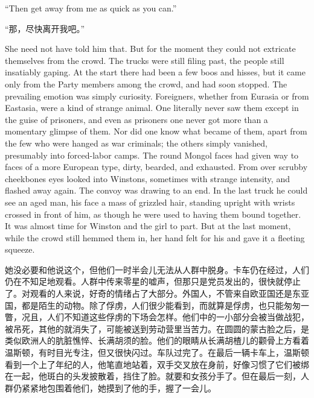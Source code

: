 \begin{paracol}{2}
``Then get away from me as quick as you can.''

\switchcolumn

``那，尽快离开我吧。''

\switchcolumn*

She need not have told him that. But for the moment they could not
extricate themselves from the crowd. The trucks were still filing past,
the people still insatiably gaping. At the start there had been a few
boos and hisses, but it came only from the Party members among the
crowd, and had soon stopped. The prevailing emotion was simply
curiosity. Foreigners, whether from Eurasia or from Eastasia, were a
kind of strange animal. One literally never saw them except in the guise
of prisoners, and even as prisoners one never got more than a momentary
glimpse of them. Nor did one know what became of them, apart from the
few who were hanged as war criminals; the others simply vanished,
presumably into forced-labor camps. The round Mongol faces had given way
to faces of a more European type, dirty, bearded, and exhausted. From
over scrubby cheekbones eyes looked into Winston\textquotesingle s,
sometimes with strange intensity, and flashed away again. The convoy was
drawing to an end. In the last truck he could see an aged man, his face
a mass of grizzled hair, standing upright with wrists crossed in front
of him, as though he were used to having them bound together. It was
almost time for Winston and the girl to part. But at the last moment,
while the crowd still hemmed them in, her hand felt for his and gave it
a fleeting squeeze.

\switchcolumn

她没必要和他说这个，但他们一时半会儿无法从人群中脱身。卡车仍在经过，人们仍在不知足地观看。人群中传来零星的嘘声，但那只是党员发出的，很快就停止了。对观看的人来说，好奇的情绪占了大部分。外国人，不管来自欧亚国还是东亚国，都是陌生的动物。除了俘虏，人们很少能看到，而就算是俘虏，也只能匆匆一瞥，况且，人们不知道这些俘虏的下场会怎样。他们中的一小部分会被当做战犯，被吊死，其他的就消失了，可能被送到劳动营里当苦力。在圆圆的蒙古脸之后，是类似欧洲人的肮脏憔悴、长满胡须的脸。他们的眼睛从长满胡楂儿的颧骨上方看着温斯顿，有时目光专注，但又很快闪过。车队过完了。在最后一辆卡车上，温斯顿看到一个上了年纪的人，他笔直地站着，双手交叉放在身前，好像习惯了它们被绑在一起，他斑白的头发披散着，挡住了脸。就要和女孩分手了。但在最后一刻，人群仍紧紧地包围着他们，她摸到了他的手，握了一会儿。

\switchcolumn*


\end{paracol}
